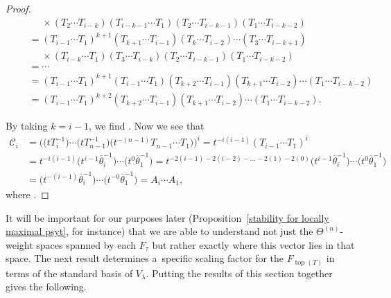 \documentclass[10pt,a4paper]{amsart}
\numberwithin{equation}{section}
\theoremstyle{definition}
\DeclareMathOperator{\Top}{\mathrm{top}}
\begin{document}
\begin{proof}
\begin{gather*}
 \phantom{ \qquad = }{} \times (T_2\cdots T_{i-k})(T_{i-k-1}\cdots T_{1})(T_{2}\cdots T_{i-k-1})(T_1 \cdots T_{i-k-2}) \\
 \qquad = (T_{i-1}\cdots T_1)^{k+1} (T_{k+1}\cdots T_{i-1})(T_k\cdots T_{i-2})\cdots (T_3\cdots T_{i-k+1}) \\
 \phantom{ \qquad = }{} \times (T_{i-k}\cdots T_{1})(T_{3}\cdots T_{i-k})(T_{2}\cdots T_{i-k-1})(T_1 \cdots T_{i-k-2}) \\
 \qquad = \cdots \\
 \qquad = (T_{i-1}\cdots T_1)^{k+1} (T_{i-1}\cdots T_1)(T_{k+2}\cdots T_{i-1})(T_{k+1}\cdots T_{i-2})\cdots (T_1\cdots T_{i-k-2}) \\
 \qquad = (T_{i-1}\cdots T_1)^{k+2}(T_{k+2}\cdots T_{i-1})(T_{k+1}\cdots T_{i-2})\cdots (T_1\cdots T_{i-k-2}).
 \end{gather*}

 By taking $k = i-1$, we find
.
 Now we see that
 \begin{align*}
 \mathscr{C}_i& = \bigl( \bigl(tT_i^{-1}\bigr)\cdots \bigl(tT_{n-1}^{-1}\bigr) \bigl(t^{-(n-1)}T_{n-1}\cdots T_1\bigr) \bigr)^{i}
 = t^{-i(i-1)} (T_{i-1}\cdots T_1)^{i} \\
 & = t^{-i(i-1)} \bigl(t^{i-1}\overline{\theta}_{i}^{-1}\bigr)\cdots \bigl(t^{0}\overline{\theta}_{1}^{-1}\bigr)
 = t^{-2(i-1)-2(i-2)-\dots -2(1)-2(0)} \bigl(t^{i-1}\overline{\theta}_{i}^{-1}\bigr)\cdots \bigl(t^{0}\overline{\theta}_{1}^{-1}\bigr) \\
 & = \bigl(t^{-(i-1)}\overline{\theta}_{i}^{-1}\bigr)\cdots \bigl(t^{-0}\overline{\theta}_{1}^{-1}\bigr)
 = A_{i}\cdots A_1 ,
 \end{align*}
 where .
\end{proof}

It will be important for our purposes later (Proposition~\ref{stability for locally maximal psyt}, for instance) that we are able to understand not just the $\Theta^{(n)}$-weight spaces spanned by each $F_{\tau}$ but rather exactly where this vector lies in that space. The next result determines a~specific scaling factor for the $F_{\Top(T)}$ in terms of the standard basis of $V_{\lambda}$. Putting the results of this section together gives the following.
\end{document}
